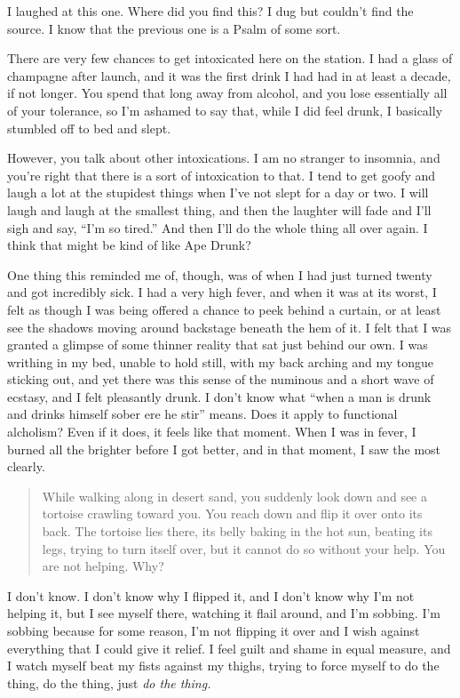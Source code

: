 I laughed at this one. Where did you find this? I dug but couldn't find the source. I know that the previous one is a Psalm of some sort.

There are very few chances to get intoxicated here on the station. I had a glass of champagne after launch, and it was the first drink I had had in at least a decade, if not longer. You spend that long away from alcohol, and you lose essentially all of your tolerance, so I'm ashamed to say that, while I did feel drunk, I basically stumbled off to bed and slept.

However, you talk about other intoxications. I am no stranger to insomnia, and you're right that there is a sort of intoxication to that. I tend to get goofy and laugh a lot at the stupidest things when I've not slept for a day or two. I will laugh and laugh at the smallest thing, and then the laughter will fade and I'll sigh and say, ``I'm so tired.'' And then I'll do the whole thing all over again. I think that might be kind of like Ape Drunk?

One thing this reminded me of, though, was of when I had just turned twenty and got incredibly sick. I had a very high fever, and when it was at its worst, I felt as though I was being offered a chance to peek behind a curtain, or at least see the shadows moving around backstage beneath the hem of it. I felt that I was granted a glimpse of some thinner reality that sat just behind our own. I was writhing in my bed, unable to hold still, with my back arching and my tongue sticking out, and yet there was this sense of the numinous and a short wave of ecstasy, and I felt pleasantly drunk. I don't know what ``when a man is drunk and drinks himself sober ere he stir'' means. Does it apply to functional alcholism? Even if it does, it feels like that moment. When I was in fever, I burned all the brighter before I got better, and in that moment, I saw the most clearly.

\begin{quote}
While walking along in desert sand, you suddenly look down and see a tortoise crawling toward you. You reach down and flip it over onto its back. The tortoise lies there, its belly baking in the hot sun, beating its legs, trying to turn itself over, but it cannot do so without your help. You are not helping. Why?
\end{quote}

I don't know. I don't know why I flipped it, and I don't know why I'm not helping it, but I see myself there, watching it flail around, and I'm sobbing. I'm sobbing because for some reason, I'm not flipping it over and I wish against everything that I could give it relief. I feel guilt and shame in equal measure, and I watch myself beat my fists against my thighs, trying to force myself to do the thing, do the thing, just \emph{do the thing.}

